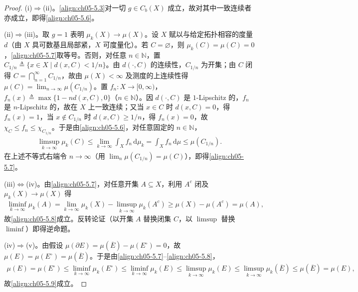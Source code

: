 \documentclass[../../main.tex]{subfiles}%
\begin{document}
\begin{proof}
(i)$\Rightarrow$(ii)。\eqref{align:ch05-5.3}对一切 $g\in C_b(X)$ 成立，故对其中一致连续者亦成立，即得\eqref{align:ch05-5.6}。

(ii)$\Rightarrow$(iii)。取 $g=1$ 表明 $\mu_k(X)\to\mu(X)$。设 $X$ 赋以与给定拓扑相容的度量 $d$（由 $X$ 具可数基且局部紧，$X$ 可度量化）。若 $C=\varnothing$，则 $\mu_k(C)=\mu(C)=0$，\eqref{align:ch05-5.7}取等号。否则，对任意 $n\in\mathbb{N}$，置 $C_{1/n}\triangleq \{x\in X\mid d(x,C)<1/n\}$。由 $d(\cdot,C)$ 的连续性，$C_{1/n}$ 为开集；由 $C$ 闭得 $C=\bigcap_{n=1}^\infty C_{1/n}$，故由 $\mu(X)<\infty$ 及测度的上连续性得 $\mu(C)=\lim_{n\to\infty}\mu(C_{1/n})$。置 $f_n:X\to[0,\infty)$，$f_n(x)\triangleq \max\{1-nd(x,C),0\}$（$n\in\mathbb{N}$）。因 $d(\cdot,C)$ 是 $1$-Lipschitz 的，$f_n$ 是 $n$-Lipschitz 的，故在 $X$ 上一致连续；又当 $x\in C$ 时 $d(x,C)=0$，得 $f_n(x)=1$，当 $x\notin C_{1/n}$ 时 $d(x,C)\geqslant1/n$，得 $f_n(x)=0$，故 $\chi_C\leqslant f_n\leqslant\chi_{C_{1/n}}$。于是由\eqref{align:ch05-5.6}，对任意固定的 $n\in\mathbb{N}$，
\begin{align*}
\limsup_{k\to\infty}\mu_k(C)
\leqslant\lim_{k\to\infty}\int_X f_n\,\mathrm{d}\mu_k
=\int_X f_n\,\mathrm{d}\mu\leqslant\mu(C_{1/n}).
\end{align*}
在上述不等式右端令 $n\to\infty$（用 $\lim_n\mu(C_{1/n})=\mu(C)$），即得\eqref{align:ch05-5.7}。

(iii)$\Leftrightarrow$(iv)。由\eqref{align:ch05-5.7}，对任意开集 $A\subseteq X$，利用 $A^c$ 闭及 $\mu_k(X)\to\mu(X)$ 得
\begin{align*}
\liminf_{k\to\infty}\mu_k(A)
=\lim_{k\to\infty}\mu_k(X)-\limsup_{k\to\infty}\mu_k(A^c)
\geqslant\mu(X)-\mu(A^c)=\mu(A),
\end{align*}
故\eqref{align:ch05-5.8}成立。反转论证（以开集 $A$ 替换闭集 $C$，以 $\limsup$ 替换 $\liminf$）即得逆命题。

(iv)$\Rightarrow$(v)。由假设 $\mu(\partial E)=\mu(\overline{E})-\mu(E^\circ)=0$，故 $\mu(E)=\mu(E^\circ)=\mu(\overline{E})$。于是由\eqref{align:ch05-5.7}–\eqref{align:ch05-5.8}，
\begin{align*}
\mu(E)=\mu(E^\circ)
\leqslant\liminf_{k\to\infty}\mu_k(E^\circ)
\leqslant\liminf_{k\to\infty}\mu_k(E)
\leqslant\limsup_{k\to\infty}\mu_k(E)
\leqslant\limsup_{k\to\infty}\mu_k(\overline{E})
\leqslant\mu(\overline{E})=\mu(E),
\end{align*}
故\eqref{align:ch05-5.9}成立。


\end{proof}
\end{document}
